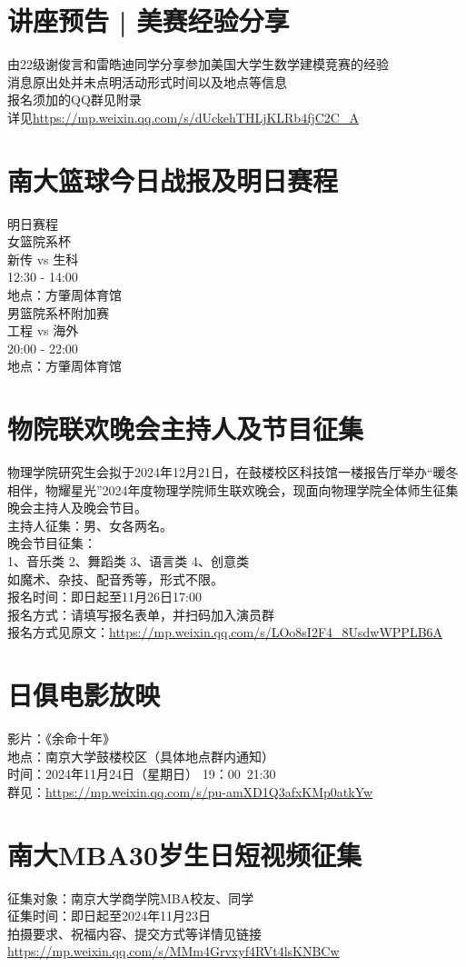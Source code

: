 \documentclass[letterpaper, 12pt]{article}
\begin{document}
\begin{multicols}{2}
\section{讲座预告 | 美赛经验分享}

由22级谢俊言和雷皓迪同学分享参加美国大学生数学建模竞赛的经验\\
消息原出处并未点明活动形式时间以及地点等信息\\
报名须加的QQ群见附录\\
详见\url{https://mp.weixin.qq.com/s/dUckehTHLjKLRb4fjC2C_A}

\section{南大篮球今日战报及明日赛程}
明日赛程\\
女篮院系杯\\
新传 vs 生科 \\
12:30 - 14:00\\
地点：方肇周体育馆\\
男篮院系杯附加赛\\
工程 vs 海外 \\
20:00 - 22:00\\
地点：方肇周体育馆\\

\section{物院联欢晚会主持人及节目征集}
物理学院研究生会拟于2024年12月21日，在鼓楼校区科技馆一楼报告厅举办“暖冬相伴，物耀星光”2024年度物理学院师生联欢晚会，现面向物理学院全体师生征集晚会主持人及晚会节目。\\
主持人征集：男、女各两名。\\
晚会节目征集：\\
1、音乐类 2、舞蹈类 3、语言类 4、创意类\\
如魔术、杂技、配音秀等，形式不限。\\
报名时间：即日起至11月26日17:00\\
报名方式：请填写报名表单，并扫码加入演员群\\
报名方式见原文：\url{https://mp.weixin.qq.com/s/LOo8sI2F4_8UsdwWPPLB6A}

\section{日俱电影放映}
影片：《余命十年》\\
地点：南京大学鼓楼校区（具体地点群内通知）\\
时间：2024年11月24日（星期日） 19：00~21:30\\
群见：\url{https://mp.weixin.qq.com/s/pu-amXD1Q3afxKMp0atkYw}

\section{南大MBA30岁生日短视频征集}
征集对象：南京大学商学院MBA校友、同学\\
征集时间：即日起至2024年11月23日\\
拍摄要求、祝福内容、提交方式等详情见链接\url{https://mp.weixin.qq.com/s/MMm4Grvxyf4RVt4lsKNBCw}

\end{multicols} 
\end{document}
